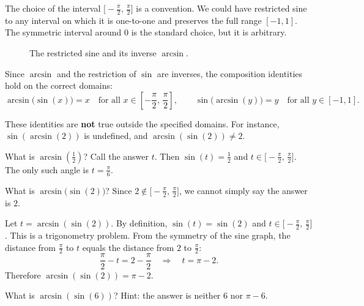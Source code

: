 \begin{remark}
The choice of the interval $\bigl[-\frac{\pi}{2},\, \frac{\pi}{2}\bigr]$ is a convention.  We could have restricted sine to any interval on which it is one-to-one and preserves the full range $[-1,1]$.  The symmetric interval around $0$ is the standard choice, but it is arbitrary.
\end{remark}

\begin{figure}[ht]
  \centering
  
  \caption{The restricted sine and its inverse $\arcsin$.}
  \label{fig:arcsin-restriction}
\end{figure}

Since $\arcsin$ and the restriction of $\sin$ are inverses, the composition identities hold on the correct domains:
\[
  \arcsin\!\bigl(\sin(x)\bigr) = x \quad \text{for all } x \in \left[-\frac{\pi}{2},\, \frac{\pi}{2}\right],
  \qquad
  \sin\!\bigl(\arcsin(y)\bigr) = y \quad \text{for all } y \in [-1,1].
\]

\begin{remark}[Warning]
These identities are \textbf{not} true outside the specified domains.  For instance, $\sin(\arcsin(2))$ is undefined, and $\arcsin(\sin(2)) \neq 2$.
\end{remark}

\begin{example}
\label{ex:4-5}
What is $\arcsin\!\left(\frac{1}{2}\right)$?  Call the answer $t$.  Then $\sin(t) = \frac{1}{2}$ and $t \in \bigl[-\frac{\pi}{2},\, \frac{\pi}{2}\bigr]$.  The only such angle is $t = \frac{\pi}{6}$.
\end{example}

\begin{example}
\label{ex:4-6}
What is $\arcsin\!\bigl(\sin(2)\bigr)$?  Since $2 \notin \bigl[-\frac{\pi}{2},\, \frac{\pi}{2}\bigr]$, we cannot simply say the answer is $2$.

Let $t = \arcsin(\sin(2))$.  By definition, $\sin(t) = \sin(2)$ and $t \in \bigl[-\frac{\pi}{2},\, \frac{\pi}{2}\bigr]$.  This is a trigonometry problem.  From the symmetry of the sine graph, the distance from $\frac{\pi}{2}$ to $t$ equals the distance from $2$ to $\frac{\pi}{2}$:
\[
  \frac{\pi}{2} - t = 2 - \frac{\pi}{2} \quad \Longrightarrow \quad t = \pi - 2.
\]
Therefore $\arcsin(\sin(2)) = \pi - 2$.
\end{example}

\begin{remark}
What is $\arcsin(\sin(6))$?  Hint: the answer is neither $6$ nor $\pi - 6$.
\end{remark}

